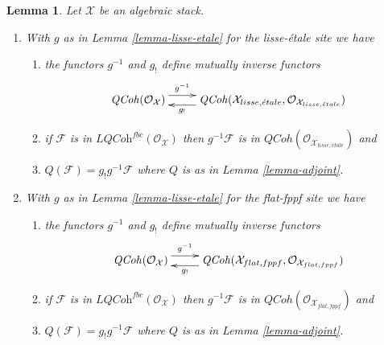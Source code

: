 \documentclass[10pt,a4paper]{amsart}
\theoremstyle{plain}
\newtheorem{lemma}[subsection]{Lemma}
\theoremstyle{definition}
\theoremstyle{remark}
\numberwithin{equation}{subsection}
\def\etale{{\acute{e}tale}}
\def\QCoh{\mathit{QCoh}}
\begin{document}
\begin{lemma}
\label{lemma-quasi-coherent}
Let $\mathcal{X}$ be an algebraic stack.
\begin{enumerate}
\item With $g$ as in Lemma \ref{lemma-lisse-etale}
for the lisse-\'etale site we have
\begin{enumerate}
\item the functors $g^{-1}$ and $g_!$ define mutually inverse functors
$$
\xymatrix{
\QCoh(\mathcal{O}_\mathcal{X}) \ar@<1ex>[r]^-{g^{-1}} &
\QCoh(\mathcal{X}_{lisse,\etale},
\mathcal{O}_{\mathcal{X}_{lisse,\etale}}) \ar@<1ex>[l]^-{g_!}
}
$$
\item if $\mathcal{F}$ is in $\textit{LQCoh}^{fbc}(\mathcal{O}_\mathcal{X})$
then $g^{-1}\mathcal{F}$ is in
$\QCoh(\mathcal{O}_{\mathcal{X}_{lisse,\etale}})$ and
\item $Q(\mathcal{F}) = g_!g^{-1}\mathcal{F}$ where $Q$ is as in
Lemma \ref{lemma-adjoint}.
\end{enumerate}
\item With $g$ as in Lemma \ref{lemma-lisse-etale}
for the flat-fppf site we have
\begin{enumerate}
\item the functors $g^{-1}$ and $g_!$ define mutually inverse functors
$$
\xymatrix{
\QCoh(\mathcal{O}_\mathcal{X}) \ar@<1ex>[r]^-{g^{-1}} &
\QCoh(\mathcal{X}_{flat,fppf},
\mathcal{O}_{\mathcal{X}_{flat,fppf}}) \ar@<1ex>[l]^-{g_!}
}
$$
\item if $\mathcal{F}$ is in $\textit{LQCoh}^{fbc}(\mathcal{O}_\mathcal{X})$
then $g^{-1}\mathcal{F}$ is in
$\QCoh(\mathcal{O}_{\mathcal{X}_{flat,fppf}})$
and
\item $Q(\mathcal{F}) = g_!g^{-1}\mathcal{F}$ where $Q$ is as in
Lemma \ref{lemma-adjoint}.
\end{enumerate}
\end{enumerate}
\end{lemma}
\end{document}
